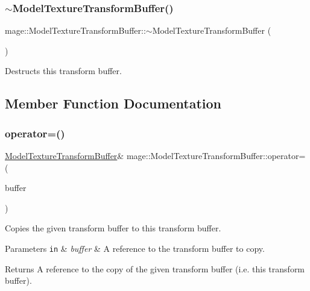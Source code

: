 \subsubsection{\texorpdfstring{$\sim$\+Model\+Texture\+Transform\+Buffer()}{~ModelTextureTransformBuffer()}}
{\footnotesize\ttfamily mage\+::\+Model\+Texture\+Transform\+Buffer\+::$\sim$\+Model\+Texture\+Transform\+Buffer (\begin{DoxyParamCaption}{ }\end{DoxyParamCaption})\hspace{0.3cm}{\ttfamily [default]}}

Destructs this transform buffer. 

\subsection{Member Function Documentation}
\hypertarget{structmage_1_1_model_texture_transform_buffer_a4fd72713afb7e68208c0356a2b55f3d9}{}\label{structmage_1_1_model_texture_transform_buffer_a4fd72713afb7e68208c0356a2b55f3d9} 
\subsubsection{\texorpdfstring{operator=()}{operator=()}\hspace{0.1cm}{\footnotesize\ttfamily [1/2]}}
{\footnotesize\ttfamily \hyperlink{structmage_1_1_model_texture_transform_buffer}{Model\+Texture\+Transform\+Buffer}\& mage\+::\+Model\+Texture\+Transform\+Buffer\+::operator= (\begin{DoxyParamCaption}\item[{const \hyperlink{structmage_1_1_model_texture_transform_buffer}{Model\+Texture\+Transform\+Buffer} \&}]{buffer }\end{DoxyParamCaption})\hspace{0.3cm}{\ttfamily [default]}}

Copies the given transform buffer to this transform buffer.


\begin{DoxyParams}[1]{Parameters}
\mbox{\tt in}  & {\em buffer} & A reference to the transform buffer to copy. \\
\hline
\end{DoxyParams}
\begin{DoxyReturn}{Returns}
A reference to the copy of the given transform buffer (i.\+e. this transform buffer). 
\end{DoxyReturn}
\hypertarget{structmage_1_1_model_texture_transform_buffer_a025ad62973c7ae20b8e977f94c509a54}{}\label{structmage_1_1_model_texture_transform_buffer_a025ad62973c7ae20b8e977f94c509a54} 
